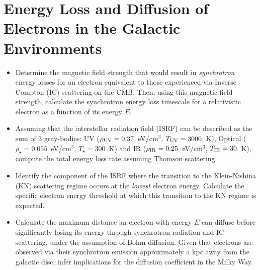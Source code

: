 \section{Energy Loss and Diffusion of Electrons in the Galactic Environments}

\begin{itemize}
\item Determine the magnetic field strength that would result in \emph{synchrotron} energy losses for an electron equivalent to those experienced via Inverse Compton (IC) scattering on the CMB. Then, using this magnetic field strength, calculate the synchrotron energy loss timescale for a relativistic electron as a function of its energy $E$.

\item Assuming that the interstellar radiation field (ISRF) can be described as the sum of 3 gray-bodies: UV ($\rho_{\rm UV} = 0.37$~eV/cm$^3$, $T_{\rm UV} = 3000$~K), Optical ($\rho_{\star} = 0.055$~eV/cm$^3$, $T_{\star} = 300$~K) and IR ($\rho_{\rm IR} = 0.25$~eV/cm$^3$, $T_{\rm IR} = 30$~K), compute the total energy loss rate assuming Thomson scattering. 

\item Identify the component of the ISRF where the transition to the Klein-Nishina (KN) scattering regime occurs at the \emph{lowest} electron energy. Calculate the specific electron energy threshold at which this transition to the KN regime is expected.

\item Calculate the maximum distance an electron with energy $E$ can diffuse before significantly losing its energy through synchrotron radiation and IC scattering, under the assumption of Bohm diffusion. Given that electrons are observed via their synchrotron emission approximately a kpc away from the galactic disc, infer implications for the diffusion coefficient in the Milky Way.
\end{itemize}
